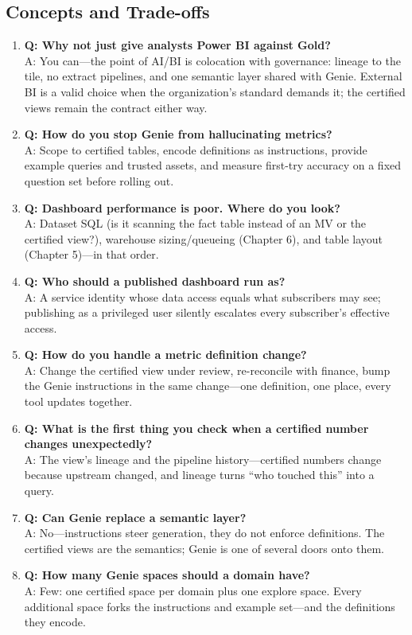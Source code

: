 \subsection{Concepts and Trade-offs}
\begin{enumerate}
    \item \textbf{Q: Why not just give analysts Power BI against Gold?}\\
    A: You can---the point of AI/BI is colocation with governance: lineage to the tile, no extract pipelines, and one semantic layer shared with Genie. External BI is a valid choice when the organization's standard demands it; the certified views remain the contract either way.
    \item \textbf{Q: How do you stop Genie from hallucinating metrics?}\\
    A: Scope to certified tables, encode definitions as instructions, provide example queries and trusted assets, and measure first-try accuracy on a fixed question set before rolling out.
    \item \textbf{Q: Dashboard performance is poor. Where do you look?}\\
    A: Dataset SQL (is it scanning the fact table instead of an MV or the certified view?), warehouse sizing/queueing (Chapter 6), and table layout (Chapter 5)---in that order.
    \item \textbf{Q: Who should a published dashboard run as?}\\
    A: A service identity whose data access equals what subscribers may see; publishing as a privileged user silently escalates every subscriber's effective access.
    \item \textbf{Q: How do you handle a metric definition change?}\\
    A: Change the certified view under review, re-reconcile with finance, bump the Genie instructions in the same change---one definition, one place, every tool updates together.
    \item \textbf{Q: What is the first thing you check when a certified number changes unexpectedly?}\\
    A: The view's lineage and the pipeline history---certified numbers change because upstream changed, and lineage turns ``who touched this'' into a query.
    \item \textbf{Q: Can Genie replace a semantic layer?}\\
    A: No---instructions steer generation, they do not enforce definitions. The certified views are the semantics; Genie is one of several doors onto them.
    \item \textbf{Q: How many Genie spaces should a domain have?}\\
    A: Few: one certified space per domain plus one explore space. Every additional space forks the instructions and example set---and the definitions they encode.
\end{enumerate}

